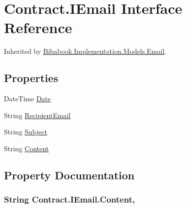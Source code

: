 \hypertarget{interface_contract_1_1_i_email}{}\section{Contract.\+I\+Email Interface Reference}
\label{interface_contract_1_1_i_email}


Inherited by \hyperlink{class_bibabook_1_1_implementation_1_1_models_1_1_email}{Bibabook.\+Implementation.\+Models.\+Email}.

\subsection*{Properties}
\begin{DoxyCompactItemize}
\item 
Date\+Time \hyperlink{interface_contract_1_1_i_email_a92e856e464f5d3c3709bcbc6b2354152}{Date}
\item 
String \hyperlink{interface_contract_1_1_i_email_a31073bab248d85973d9e36ce4475a636}{Recipient\+Email}
\item 
String \hyperlink{interface_contract_1_1_i_email_a5defb28657fa6e8aa53ba01ff87d62f3}{Subject}
\item 
String \hyperlink{interface_contract_1_1_i_email_ab09442f9e63a1a17e2539a4250743ceb}{Content}
\end{DoxyCompactItemize}


\subsection{Property Documentation}
\hypertarget{interface_contract_1_1_i_email_ab09442f9e63a1a17e2539a4250743ceb}{}
\subsubsection[{Content}]{\setlength{\rightskip}{0pt plus 5cm}String Contract.\+I\+Email.\+Content\hspace{0.3cm}{\ttfamily [get]}, {\ttfamily [set]}}\label{interface_contract_1_1_i_email_ab09442f9e63a1a17e2539a4250743ceb}
\hypertarget{interface_contract_1_1_i_email_a92e856e464f5d3c3709bcbc6b2354152}{}
